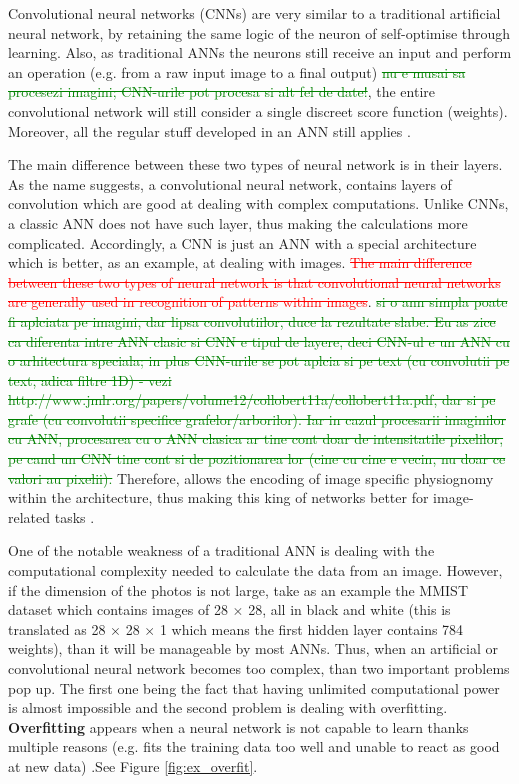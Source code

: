 Convolutional neural networks (CNNs) are very similar to a traditional artificial neural network, by retaining the same logic of the neuron of self-optimise through learning. Also, as traditional ANNs the neurons still receive an input and perform an operation (e.g. from a raw input image to a final output) \textcolor{green}{\sout{nu e musai sa procesezi imagini; CNN-urile pot procesa si alt fel de date!}}, the entire convolutional network will still consider a single discreet score function (weights). Moreover, all the regular stuff developed in an ANN still applies \cite{IntroCNN, 3dconvolutional}. \par

The main difference between these two types of neural network is in their layers. As the name suggests, a convolutional neural network, contains layers of convolution which are good at dealing with complex computations. Unlike CNNs, a classic ANN does not have such layer, thus making the calculations more complicated. Accordingly, a CNN is just an ANN with a special architecture which is better, as an example, at dealing with images.
\textcolor{red}{\sout{The main difference between these two types of neural network is that convolutional neural networks are generally used in recognition of patterns within images}}. \textcolor{green}{\sout{si o ann simpla poate fi aplciata pe imagini, dar lipsa convolutiilor, duce la rezultate slabe. Eu as zice ca diferenta intre ANN clasic si CNN e tipul de layere, deci CNN-ul e un ANN cu o arhitectura speciala; in plus CNN-urile se pot aplcia si pe text (cu convolutii pe text, adica filtre 1D) - vezi http://www.jmlr.org/papers/volume12/collobert11a/collobert11a.pdf, dar si pe grafe (cu convolutii specifice grafelor/arborilor). Iar in cazul procesarii imaginilor cu ANN, procesarea cu o ANN clasica ar tine cont doar de intensitatile pixelilor, pe cand un CNN tine cont si de pozitionarea lor (cine cu cine e vecin, nu doar ce valori au pixelii).}} Therefore, allows the encoding of image specific physiognomy within the architecture, thus making this king of networks better for image-related tasks \cite{IntroCNN, 3dconvolutional}. \par

One of the notable weakness of a traditional ANN is dealing with the computational complexity needed to calculate the data from an image. However, if the dimension of the photos is not large, take as an example the MMIST dataset which contains images of 28 $\times$ 28, all in black and white (this is translated as 28 $\times$ 28 $\times$ 1 which means the first hidden layer contains 784 weights), than it will be manageable by most ANNs. Thus, when an artificial or convolutional neural network becomes too complex, than two important problems pop up. The first one being the fact that having unlimited computational power is almost impossible and the second problem is dealing with overfitting. \textbf{Overfitting} appears when a neural network is not capable to learn thanks multiple reasons (e.g. fits the training data too well and unable to react as good at new data) \cite{IntroCNN}.See Figure \ref{fig:ex_overfit}. \par

